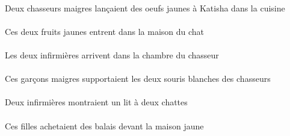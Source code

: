 \begin{exe}
\DEFSgOblP{}   \cuisineDSgOblP{}   \DANSP{}   \INDDuErgP{}   \maigreCDuP{}   \chasseurCDuErgP{}    \INDSgDatP{}   \KatishaASgDatP{}   \INDPlAbsP{}   \jauneCPlP{}   \oeufCPlAbsP{}  \lancerVdPstCPlP{}\\
Deux chasseurs maigres lançaient des oeufs jaunes à Katisha dans la cuisine
\ex\gll
\DEMDuAbs{}   \jauneADu{}   \fruitADuAbs{}    \DEFSgObl{}    \DEFSgObl{}   \chatDSgObl{}   \DE{}   \maisonDSgObl{}   \DANS{}  \entrerViPrsADu{}\\
\DEMDuAbsP{}   \jauneADuP{}   \fruitADuAbsP{}    \DEFSgOblP{}    \DEFSgOblP{}   \chatDSgOblP{}   \DEP{}   \maisonDSgOblP{}   \DANSP{}  \entrerViPrsADuP{}\\
Ces deux fruits jaunes entrent dans la maison du chat
\ex\gll
\DEFDuAbs{}   \infirmiereADuAbs{}    \DEFSgObl{}    \DEFSgObl{}   \chasseurCSgObl{}   \DE{}   \chambreBSgObl{}   \DANS{}  \arriverViPrsADu{}\\
\DEFDuAbsP{}   \infirmiereADuAbsP{}    \DEFSgOblP{}    \DEFSgOblP{}   \chasseurCSgOblP{}   \DEP{}   \chambreBSgOblP{}   \DANSP{}  \arriverViPrsADuP{}\\
Les deux infirmières arrivent dans la chambre du chasseur
\ex\gll
\DEMPlErg{}   \maigreDPl{}   \garconDPlErg{}   \DEFDuAbs{}    \DEFPlObl{}   \chasseurCPlObl{}   \DE{}   \blancBDu{}   \sourisBDuAbs{}  \supporterVtPstBDu{}\\
\DEMPlErgP{}   \maigreDPlP{}   \garconDPlErgP{}   \DEFDuAbsP{}    \DEFPlOblP{}   \chasseurCPlOblP{}   \DEP{}   \blancBDuP{}   \sourisBDuAbsP{}  \supporterVtPstBDuP{}\\
Ces garçons maigres supportaient les deux souris blanches des chasseurs
\ex\gll
\INDDuErg{}   \infirmiereADuErg{}    \INDDuDat{}   \chatDDuDat{}   \INDSgAbs{}   \litDSgAbs{}  \montrerVdPstDSg{}\\
\INDDuErgP{}   \infirmiereADuErgP{}    \INDDuDatP{}   \chatDDuDatP{}   \INDSgAbsP{}   \litDSgAbsP{}  \montrerVdPstDSgP{}\\
Deux infirmières montraient un lit à deux chattes
\ex\gll
\DEFSgObl{}   \jauneDSg{}   \maisonDSgObl{}   \DEVANT{}   \DEMPlErg{}   \filleCPlErg{}   \INDPlAbs{}   \balaiAPlAbs{}  \acheterVtPstAPl{}\\
\DEFSgOblP{}   \jauneDSgP{}   \maisonDSgOblP{}   \DEVANTP{}   \DEMPlErgP{}   \filleCPlErgP{}   \INDPlAbsP{}   \balaiAPlAbsP{}  \acheterVtPstAPlP{}\\
Ces filles achetaient des balais devant la maison jaune
\ex\gll
\INDSgErg{}   \NicoleBSgErg{}    \DEFPlDat{}    \DEFPlObl{}   \infirmiereAPlObl{}   \DE{}   \filleCPlDat{}   \DEFSgAbs{}    \DEFSgObl{}   \maisonDSgObl{}   \DE{}   \cuisineDSgAbs{}  \montrerVdPrsDSg{}\\

\end{exe}
